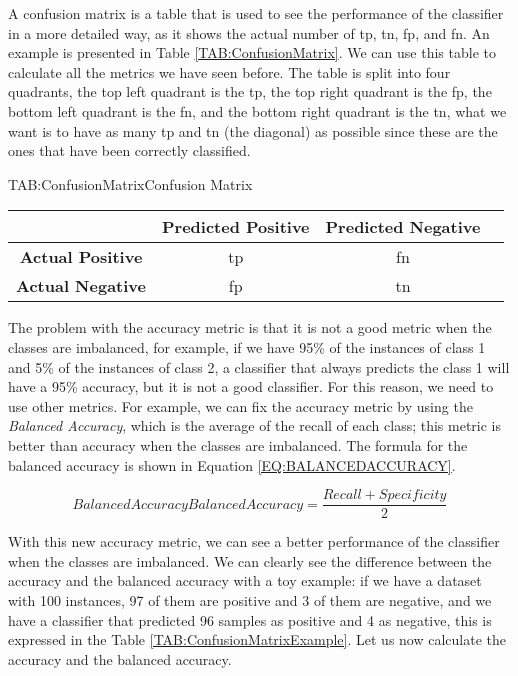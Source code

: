 A confusion matrix is a table that is used to see the performance of the classifier in a more detailed way, as it shows the actual number of \ac{tp}, \ac{tn}, \ac{fp}, and \ac{fn}. An example is presented in Table \ref{TAB:ConfusionMatrix}. We can use this table to calculate all the metrics we have seen before. The table is split into four quadrants, the top left quadrant is the \ac{tp}, the top right quadrant is the \ac{fp}, the bottom left quadrant is the \ac{fn}, and the bottom right quadrant is the \ac{tn}, what we want is to have as many \ac{tp} and \ac{tn} (the diagonal) as possible since these are the ones that have been correctly classified.

\begin{table}[Confusion Matrix]{TAB:ConfusionMatrix}{Confusion Matrix}
    \begin{tabular}{cccc}
            \hline
            & \textbf{Predicted Positive} & \textbf{Predicted Negative} \\
            \hline \hline
            \textbf{Actual Positive} & \acl{tp} & \acl{fn} \\
            \textbf{Actual Negative} & \acl{fp}  & \acl{tn} \\
            \hline
        \end{tabular}
\end{table}


The problem with the accuracy metric is that it is not a good metric when the classes are imbalanced, for example, if we have 95\% of the instances of class 1 and 5\% of the instances of class 2, a classifier that always predicts the class 1 will have a 95\% accuracy, but it is not a good classifier. For this reason, we need to use other metrics. For example, we can fix the accuracy metric by using the \textit{Balanced Accuracy}, which is the average of the recall of each class; this metric is better than accuracy when the classes are imbalanced. The formula for the balanced accuracy is shown in Equation \ref{EQ:BALANCEDACCURACY}.

\begin{equation}[EQ:BALANCEDACCURACY]{Balanced Accuracy}
    \boxed{Balanced Accuracy = \frac{Recall + Specificity}{2}}
\end{equation}

With this new accuracy metric, we can see a better performance of the classifier when the classes are imbalanced. We can clearly see the difference between the accuracy and the balanced accuracy with a toy example: if we have a dataset with 100 instances, 97 of them are positive and 3 of them are negative, and we have a classifier that predicted 96 samples as positive and 4 as negative, this is expressed in the Table \ref{TAB:ConfusionMatrixExample}. Let us now calculate the accuracy and the balanced accuracy.

